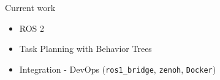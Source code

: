 \begin{frame}{Current work}

  \begin{itemize}
    \item ROS 2
    \item Task Planning with Behavior Trees
    \item Integration - DevOps (\texttt{ros1\_bridge}, \texttt{zenoh}, \texttt{Docker})
  \end{itemize}

\end{frame}
